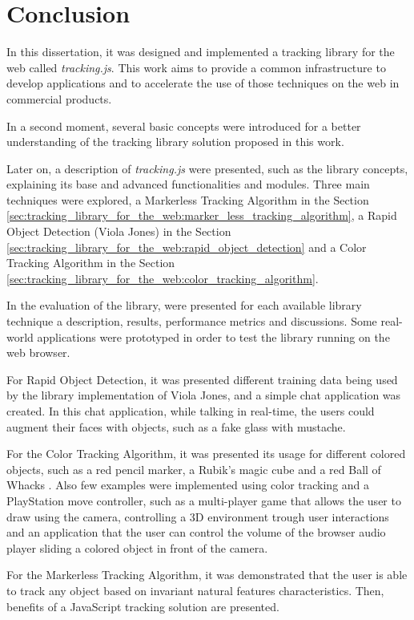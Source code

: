\chapter{Conclusion} %
\label{cha:conclusion}

In this dissertation, it was designed and implemented a tracking library for the web called \textit{tracking.js}. This work aims to provide a common infrastructure to develop applications and to accelerate the use of those techniques on the web in commercial products.

In a second moment, several basic concepts were introduced for a better understanding of the tracking library solution proposed in this work.

Later on, a description of \textit{tracking.js} were presented, such as the library concepts, explaining its base and advanced functionalities and modules. Three main techniques were explored, a Markerless Tracking Algorithm in the Section \ref{sec:tracking_library_for_the_web:marker_less_tracking_algorithm}, a Rapid Object Detection (Viola Jones) in the Section \ref{sec:tracking_library_for_the_web:rapid_object_detection} and a Color Tracking Algorithm in the Section \ref{sec:tracking_library_for_the_web:color_tracking_algorithm}.

In the evaluation of the library, were presented for each available library technique a description, results, performance metrics and discussions. Some real-world applications were prototyped in order to test the library running on the web browser.

For Rapid Object Detection, it was presented different training data being used by the library implementation of Viola Jones, and a simple chat application was created. In this chat application, while talking in real-time, the users could augment their faces with objects, such as a fake glass with mustache.

For the Color Tracking Algorithm, it was presented its usage for different colored objects, such as a red pencil marker, a Rubik’s magic cube \cite{Rubiks2013} and a red Ball of Whacks \cite{Whack2013}. Also few examples were implemented using color tracking and a PlayStation move controller, such as a multi-player game that allows the user to draw using the camera, controlling a 3D environment trough user interactions and an application that the user can control the volume of the browser audio player sliding a colored object in front of the camera.

For the Markerless Tracking Algorithm, it was demonstrated that the user is able to track any object based on invariant natural features characteristics. Then, benefits of a JavaScript tracking solution are presented.

